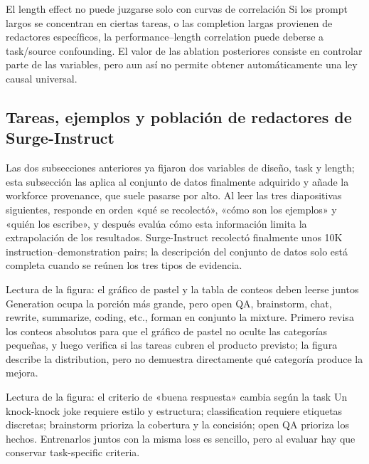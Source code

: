 \begin{warningbox}{El length effect no puede juzgarse solo con curvas de correlación}
Si los prompt largos se concentran en ciertas tareas, o las completion largas provienen de redactores específicos, la performance--length correlation puede deberse a task/source confounding. El valor de las ablation posteriores consiste en controlar parte de las variables, pero aun así no permite obtener automáticamente una ley causal universal.
\end{warningbox}

\subsection{Tareas, ejemplos y población de redactores de Surge-Instruct}

Las dos subsecciones anteriores ya fijaron dos variables de diseño, task y length; esta subsección las aplica al conjunto de datos finalmente adquirido y añade la workforce provenance, que suele pasarse por alto. Al leer las tres diapositivas siguientes, responde en orden «qué se recolectó», «cómo son los ejemplos» y «quién los escribe», y después evalúa cómo esta información limita la extrapolación de los resultados. Surge-Instruct recolectó finalmente unos 10K instruction--demonstration pairs; la descripción del conjunto de datos solo está completa cuando se reúnen los tres tipos de evidencia.


\begin{knowledgebox}{Lectura de la figura: el gráfico de pastel y la tabla de conteos deben leerse juntos}
Generation ocupa la porción más grande, pero open QA, brainstorm, chat, rewrite, summarize, coding, etc., forman en conjunto la mixture. Primero revisa los conteos absolutos para que el gráfico de pastel no oculte las categorías pequeñas, y luego verifica si las tareas cubren el producto previsto; la figura describe la distribution, pero no demuestra directamente qué categoría produce la mejora.
\end{knowledgebox}


\begin{knowledgebox}{Lectura de la figura: el criterio de «buena respuesta» cambia según la task}
Un knock-knock joke requiere estilo y estructura; classification requiere etiquetas discretas; brainstorm prioriza la cobertura y la concisión; open QA prioriza los hechos. Entrenarlos juntos con la misma loss es sencillo, pero al evaluar hay que conservar task-specific criteria.
\end{knowledgebox}

